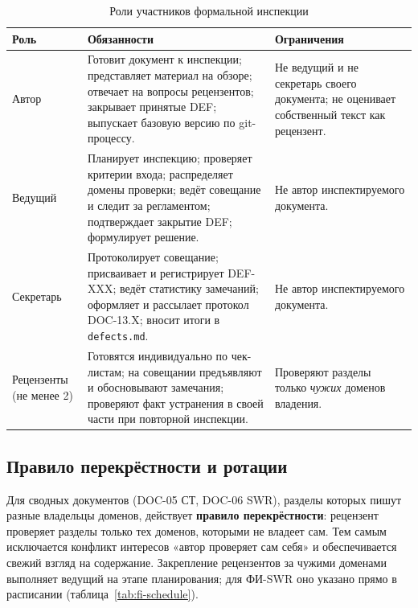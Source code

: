 \documentclass[12pt,a4paper]{article}
\begin{document}
\begin{table}[h!]
  \centering
  \caption{Роли участников формальной инспекции}
  \label{tab:roles}
  \begin{tabularx}{\textwidth}{
    >{\raggedright\arraybackslash}p{2.6cm}
    >{\raggedright\arraybackslash}X
    >{\raggedright\arraybackslash}p{4.4cm}}
    \toprule
    \textbf{Роль} & \textbf{Обязанности} & \textbf{Ограничения} \\
    \midrule
    Автор &
    Готовит документ к инспекции; представляет материал на обзоре; отвечает на
    вопросы рецензентов; закрывает принятые DEF; выпускает базовую версию по
    git-процессу. &
    Не ведущий и не секретарь своего документа; не оценивает собственный текст
    как рецензент. \\
    \addlinespace
    Ведущий &
    Планирует инспекцию; проверяет критерии входа; распределяет домены
    проверки; ведёт совещание и следит за регламентом; подтверждает закрытие
    DEF; формулирует решение. &
    Не автор инспектируемого документа. \\
    \addlinespace
    Секретарь &
    Протоколирует совещание; присваивает и регистрирует DEF-XXX; ведёт
    статистику замечаний; оформляет и рассылает протокол DOC-13.X; вносит
    итоги в \texttt{defects.md}. &
    Не автор инспектируемого документа. \\
    \addlinespace
    Рецензенты (не менее 2) &
    Готовятся индивидуально по чек-листам; на совещании предъявляют и
    обосновывают замечания; проверяют факт устранения в своей части при
    повторной инспекции. &
    Проверяют разделы только \emph{чужих} доменов владения. \\
    \bottomrule
  \end{tabularx}
\end{table}

\subsection{Правило перекрёстности и ротации}

Для сводных документов (DOC-05 СТ, DOC-06 SWR), разделы которых пишут разные
владельцы доменов, действует \textbf{правило перекрёстности}: рецензент
проверяет разделы только тех доменов, которыми не владеет сам. Тем самым
исключается конфликт интересов «автор проверяет сам себя» и обеспечивается
свежий взгляд на содержание. Закрепление рецензентов за чужими доменами
выполняет ведущий на этапе планирования; для ФИ-SWR оно указано прямо в
расписании (таблица~\ref{tab:fi-schedule}).
\end{document}

